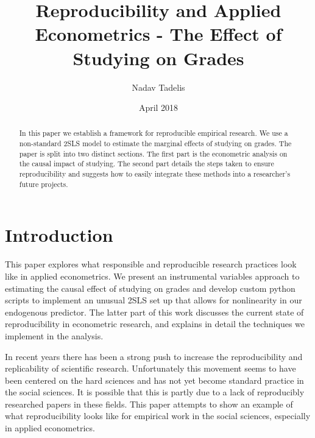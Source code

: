 \documentclass[12pt]{article}
\begin{document}
\title{Reproducibility and Applied Econometrics - The Effect of Studying on Grades}

\author{Nadav Tadelis}

\date{April 2018}



\maketitle

\hskip 80pt 


\begin{abstract}
In this paper we establish a framework for reproducible empirical research. We use a non-standard 2SLS model to estimate the marginal effects of studying on grades. The paper is split into two distinct sections. The first part is the econometric analysis on the causal impact of studying. The second part details the steps taken to ensure reproducibility and suggests how to easily integrate these methods into a researcher's future projects.
\end{abstract}

\clearpage



\section{Introduction}
\label{sec_intro}
This paper explores what responsible and reproducible research practices look like in applied econometrics. We present an instrumental variables approach to estimating the causal effect of studying on grades and develop custom python scripts to implement an unusual 2SLS set up that allows for nonlinearity in our endogenous predictor. The latter part of this work discusses the current state of reproducibility in econometric research, and explains in detail the techniques we implement in the analysis.

In recent years there has been a strong push to increase the reproducibility and replicability of scientific research. Unfortunately this movement seems to have been centered on the hard sciences and has not yet become standard practice in the social sciences. It is possible that this is partly due to a lack of reproducibly researched papers in these fields. This paper attempts to show an example of what reproducibility looks like for empirical work in the social sciences, especially in applied econometrics.
\end{document}
